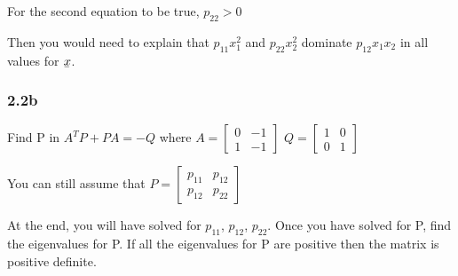 \documentclass[12pt]{article}
\newcommand{\ubar}[1]{\underaccent{\bar}{#1}}
\begin{document}
For the second equation to be true, $p_{22}>0$ 

Then you would need to explain that $p_{11}x_{1}^2$ and $p_{22}x_{2}^2$ dominate $p_{12}x_1x_2$ in all values for $\ubar{x}$. 

\subsubsection*{2.2b}
Find P in $A^TP+PA=-Q$ where 
$A=\begin{bmatrix} 0 & -1 \\
1 & -1
\end{bmatrix}$
$Q=\begin{bmatrix} 1 & 0 \\
0 & 1
\end{bmatrix}$

You can still assume that $P=\begin{bmatrix} p_{11} & p_{12} \\
p_{12} & p_{22}
\end{bmatrix}$

At the end, you will have solved for $p_{11}$, $p_{12}$, $p_{22}$. Once you have solved for P, find the eigenvalues for P. If all the eigenvalues for P are positive then the matrix is positive definite. 
\end{document}

